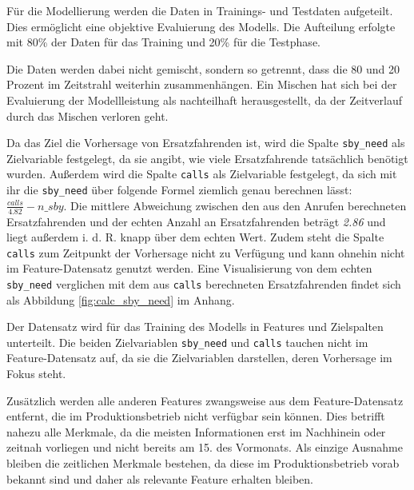 \documentclass[%
pdftex,
oneside,			%
11pt,				%
parskip=half,		%
headheight = 12pt,	%
headsepline,		%
footsepline,		%
footheight = 16pt,	%
abstracton,		%
DIV=calc,		%
BCOR=8mm,		%
headinclude=false,	%
footinclude=false,	%
listof=totoc,		%
toc=bibliography,	%
]{scrreprt}	%
\begin{document}

            Für die Modellierung werden die Daten in Trainings- und Testdaten aufgeteilt. 
            Dies ermöglicht eine objektive Evaluierung des Modells. 
            Die Aufteilung erfolgte mit 80\% der Daten für das Training und 20\% für die Testphase.

            Die Daten werden dabei nicht gemischt, sondern so getrennt, dass die 80 und 20 Prozent im Zeitstrahl weiterhin zusammenhängen.
            Ein Mischen hat sich bei der Evaluierung der Modellleistung als nachteilhaft herausgestellt, da der Zeitverlauf durch das Mischen verloren geht.

            Da das Ziel die Vorhersage von Ersatzfahrenden ist, wird die Spalte \texttt{sby\_need} als Zielvariable festgelegt, da sie angibt, wie viele Ersatzfahrende tatsächlich benötigt wurden.
            Außerdem wird die Spalte \texttt{calls} als Zielvariable festgelegt, da sich mit ihr die \texttt{sby\_need} über folgende Formel ziemlich genau berechnen lässt: $\frac{calls}{4.82}-n\_sby$.
            Die mittlere Abweichung zwischen den aus den Anrufen berechneten Ersatzfahrenden und der echten Anzahl an Ersatzfahrenden beträgt \textit{2.86} und liegt außerdem i. d. R. knapp über dem echten Wert.
            Zudem steht die Spalte \texttt{calls} zum Zeitpunkt der Vorhersage nicht zu Verfügung und kann ohnehin nicht im Feature-Datensatz genutzt werden.
            Eine Visualisierung von dem echten \texttt{sby\_need} verglichen mit dem aus \texttt{calls} berechneten Ersatzfahrenden findet sich als Abbildung \ref{fig:calc_sby_need} im Anhang.

            Der Datensatz wird für das Training des Modells in Features und Zielspalten unterteilt. 
            Die beiden Zielvariablen \texttt{sby\_need} und \texttt{calls} tauchen nicht im Feature-Datensatz auf, da sie die Zielvariablen darstellen, deren Vorhersage im Fokus steht.

            Zusätzlich werden alle anderen Features zwangsweise aus dem Feature-Datensatz entfernt, die im Produktionsbetrieb nicht verfügbar sein können. 
            Dies betrifft nahezu alle Merkmale, da die meisten Informationen erst im Nachhinein oder zeitnah vorliegen und nicht bereits am 15. des Vormonats.
            Als einzige Ausnahme bleiben die zeitlichen Merkmale bestehen, da diese im Produktionsbetrieb vorab bekannt sind und daher als relevante Feature erhalten bleiben.
\end{document}
